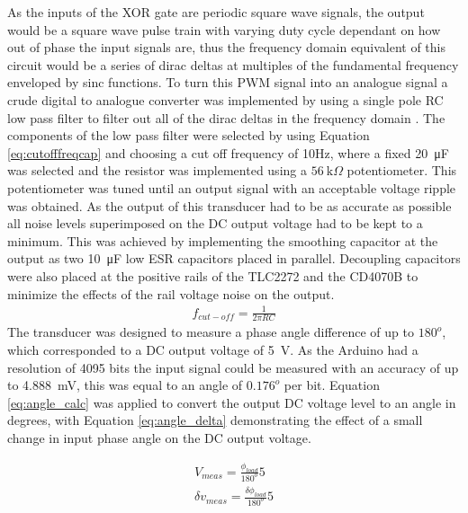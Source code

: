 As the inputs of the XOR gate are periodic square wave signals, the output would be a square wave pulse train with varying duty cycle dependant on how out of phase the input signals are, thus the frequency domain equivalent of this circuit would be a series of dirac deltas at multiples of the fundamental frequency enveloped by sinc functions. To turn this PWM signal into an analogue signal a crude digital to analogue converter was implemented by using a single pole RC low pass filter to filter out all of the dirac deltas in the frequency domain \cite{PWMref}. The components of the low pass filter were selected by using Equation \ref{eq:cutofffreqcap} and choosing a cut off frequency of 10Hz, where a fixed \SI{20}{\micro F} was selected and the resistor was implemented using a $\SI{56}{\kilo \Omega}$ potentiometer. This potentiometer was tuned until an output signal with an acceptable voltage ripple was obtained. As the output of this transducer had to be as accurate as possible all noise levels superimposed on the DC output voltage had to be kept to a minimum. This was achieved by implementing the smoothing capacitor at the output as two \SI{10}{\micro F} low ESR capacitors placed in parallel. Decoupling capacitors were also placed at the positive rails of the TLC2272 and the CD4070B to minimize the effects of the rail voltage noise on the output.
\begin{align}
    f_{cut-off}=\frac{1}{2\pi RC} 
   \label{eq:cutofffreqcap}
\end{align}
The transducer was designed to measure a phase angle difference of up to $180^o$, which corresponded to a DC output voltage of \SI{5}{\volt}. As the Arduino had a resolution of 4095 bits the input signal could be measured with an accuracy of up to \SI{4.888}{\milli V}, this was equal to an angle of $0.176^o$ per bit. Equation \ref{eq:angle_calc} was applied to convert the output DC voltage level to an angle in degrees, with Equation \ref{eq:angle_delta} demonstrating the effect of a small change in input phase angle on the DC output voltage.

\begin{align}
    V_{meas} =\frac{\phi_{load}}{180^o} 5 \label{eq:angle_calc} \\
    \delta v_{meas} =\frac{\delta \phi_{load}}{180^o} 5 \label{eq:angle_delta}
\end{align}

